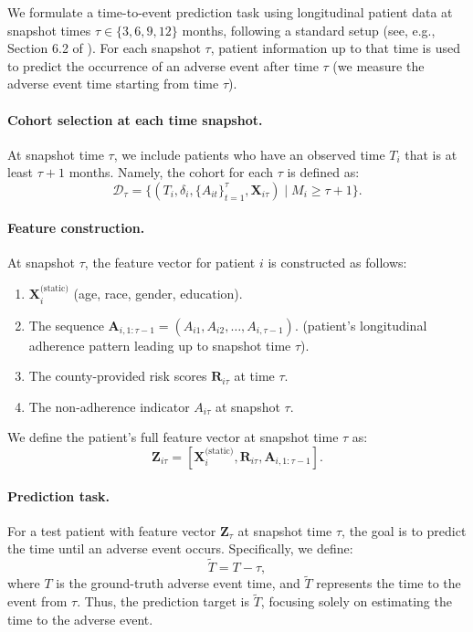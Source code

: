 We formulate a time-to-event prediction task using longitudinal patient data at snapshot times \(\tau \in \{3,6,9,12\}\) months, following a standard setup (see, e.g., Section 6.2 of \citet{chen2024introduction}). %
For each snapshot \(\tau\), patient information up to that time is used to predict the occurrence of an adverse event after time $\tau$ (we measure the adverse event time starting from time $\tau$). 

\paragraph{Cohort selection at each time snapshot.}  
At snapshot time \(\tau\), we include patients who have an observed time $T_i$ that is at least \(\tau+1\) months. 
Namely, the cohort for each \(\tau\) is defined as:
\[
\mathcal{D}_\tau = \{(T_i, \delta_i, \{A_{it}\}_{t=1}^{\tau}, \mathbf{X}_{i\tau}) \mid M_i \geq \tau+1\}.
\]

\paragraph{Feature construction.}  
At snapshot \(\tau\), the feature vector for patient \(i\) is constructed as follows:
\begin{enumerate}[label=(\roman*),itemsep=0pt]
    \item {} \( \mathbf{X}_i^{\text{(static)}} \) (age, race, gender, education).
    \item {} The sequence \(\mathbf{A}_{i,1:\tau-1} = (A_{i1}, A_{i2}, \dots, A_{i,\tau-1})\). (patient's longitudinal adherence pattern leading up to snapshot time \(\tau\)).
    \item {} The county-provided risk scores \(\mathbf{R}_{i\tau}\) at time \(\tau\).
    \item {} The non-adherence indicator \(A_{i\tau}\) at snapshot \(\tau\).
\end{enumerate}

We define the patient’s full feature vector at snapshot time \( \tau \) as:
\[
\mathbf{Z}_{i\tau} = \left[ \mathbf{X}^{\text{(static)}}_{i}, \mathbf{R}_{i\tau}, \mathbf{A}_{i,1:\tau-1} \right].
\]

\paragraph{Prediction task.}  
For a test patient with feature vector \(\mathbf{Z}_{\tau}\) at snapshot time \(\tau\), the goal is to predict the time until an adverse event occurs.  
Specifically, we define: 
\[\widetilde{T} = T - \tau,\]
where \(T\) is the ground-truth adverse event time, and 
\(\widetilde{T}\) represents the time to the event from \(\tau\).  
Thus, the prediction target is \(\widetilde{T}\), focusing solely on estimating the time to the adverse event.